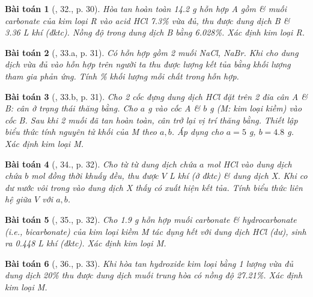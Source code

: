 \documentclass{article}
\newtheorem{baitoan}{Bài toán}
\begin{document}
\begin{baitoan}[\cite{An_350_BT_Hoa_Hoc_9}, 32., p. 30]
	Hòa tan hoàn toàn \emph{14.2 g} hỗn hợp A gồm \emph{} \& muối carbonate của kim loại R vào acid \emph{HCl 7.3\%} vừa đủ, thu được dung dịch B \& \emph{3.36 L} khí \emph{} (đktc). Nồng độ \emph{} trong dung dịch B bằng \emph{6.028\%}. Xác định kim loại R.
\end{baitoan}

\begin{baitoan}[\cite{An_350_BT_Hoa_Hoc_9}, 33.a, p. 31]
	Có hỗn hợp gồm 2 muối \emph{NaCl, NaBr}. Khi cho dung dịch \emph{} vừa đủ vào hỗn hợp trên người ta thu được lượng kết tủa bằng khối lượng \emph{} tham gia phản ứng. Tính \% khối lượng mỗi chất trong hỗn hợp.
\end{baitoan}

\begin{baitoan}[\cite{An_350_BT_Hoa_Hoc_9}, 33.b, p. 31]
	Cho 2 cốc đựng dung dịch \emph{HCl} đặt trên 2 đĩa cân A \& B: cân ở trạng thái thăng bằng. Cho $a$ \emph{g } vào cốc A \& $b$ \emph{g } (M: kim loại kiềm) vào cốc B. Sau khi 2 muối đã tan hoàn toàn, cân trở lại vị trí thăng bằng. Thiết lập biểu thức tính nguyên tử khối của M theo $a,b$. Áp dụng cho $a = 5$ \emph{g}, $b = 4.8$ \emph{g}. Xác định kim loại M.
\end{baitoan}

\begin{baitoan}[\cite{An_350_BT_Hoa_Hoc_9}, 34., p. 32]
	Cho từ từ dung dịch chứa $a$ \emph{mol HCl} vào dung dịch chứa $b$ \emph{mol } đồng thời khuấy đều, thu được $V$ \emph{L} khí (ở đktc) \& dung dịch X. Khi co dư nước vôi trong vào dung dịch X thấy có xuất hiện kết tủa. Tính biểu thức liên hệ giữa $V$ với $a,b$.
\end{baitoan}

\begin{baitoan}[\cite{An_350_BT_Hoa_Hoc_9}, 35., p. 32]
	Cho \emph{1.9 g} hỗn hợp muối carbonate \& hydrocarbonate (i.e., bicarbonate) của kim loại kiềm M tác dụng hết với dung dịch \emph{HCl} (dư), sinh ra \emph{0.448 L} khí (đktc). Xác định kim loại M.
\end{baitoan}

\begin{baitoan}[\cite{An_350_BT_Hoa_Hoc_9}, 36., p. 33]
	Khi hòa tan hydroxide kim loại \emph{} bằng 1 lượng vừa đủ dung dịch \emph{ 20\%} thu được dung dịch muối trung hòa có nồng độ \emph{27.21\%}. Xác định kim loại M.
\end{baitoan}
\end{document}
